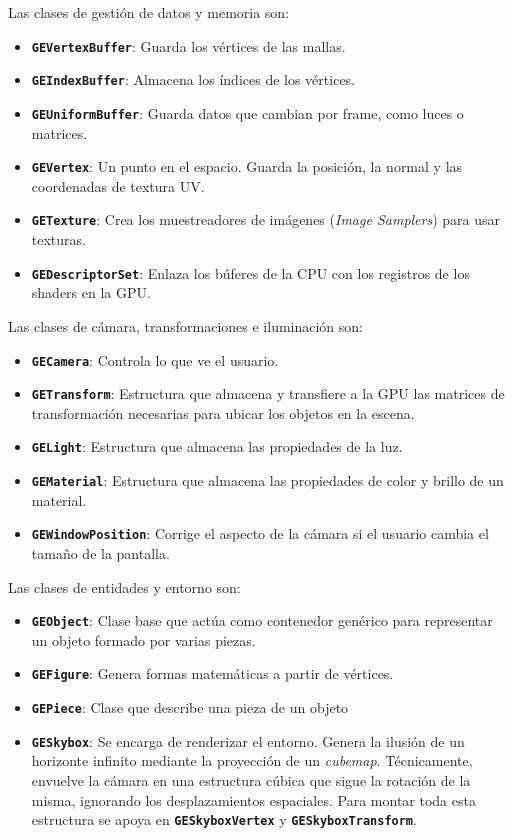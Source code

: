 \noindent Las clases de gestión de datos y memoria son:

\begin{itemize}
\item \textbf{\texttt{GEVertexBuffer}}: Guarda los vértices de las mallas.
\item \textbf{\texttt{GEIndexBuffer}}: Almacena los índices de los vértices.
\item \textbf{\texttt{GEUniformBuffer}}: Guarda datos que cambian por frame, como luces o matrices.
\item \textbf{\texttt{GEVertex}}: Un punto en el espacio. Guarda la posición, la normal y las coordenadas de textura UV.
\item \textbf{\texttt{GETexture}}: Crea los muestreadores de imágenes (\textit{Image Samplers}) para usar texturas.
\item \textbf{\texttt{GEDescriptorSet}}: Enlaza los búferes de la CPU con los registros de los shaders en la GPU.
\end{itemize}


\noindent Las clases de cámara, transformaciones e iluminación son:
 
\begin{itemize}
\item \textbf{\texttt{GECamera}}: Controla lo que ve el usuario.
\item \textbf{\texttt{GETransform}}: Estructura que almacena y transfiere a la GPU las matrices de transformación necesarias para ubicar los objetos en la escena.
\item \textbf{\texttt{GELight}}: Estructura que almacena las propiedades de la luz.
\item \textbf{\texttt{GEMaterial}}: Estructura que almacena las propiedades de color y brillo de un material.
\item \textbf{\texttt{GEWindowPosition}}: Corrige el aspecto de la cámara si el usuario cambia el tamaño de la pantalla.
\end{itemize}

\noindent Las clases de entidades y entorno son: 

\begin{itemize}
\item \textbf{\texttt{GEObject}}: Clase base que actúa como contenedor genérico para representar un objeto formado por varias piezas.
\item \textbf{\texttt{GEFigure}}: Genera formas matemáticas a partir de vértices. 
\item \textbf{\texttt{GEPiece}}: Clase que describe una pieza de un objeto
\item \textbf{\texttt{GESkybox}}: Se encarga de renderizar el entorno. Genera la ilusión de un horizonte infinito mediante la proyección de un \textit{cubemap}. Técnicamente, envuelve la cámara en una estructura cúbica que sigue la rotación de la misma, ignorando los desplazamientos espaciales. Para montar toda esta estructura se apoya en \textbf{\texttt{GESkyboxVertex}} y \textbf{\texttt{GESkyboxTransform}}.
\end{itemize}



